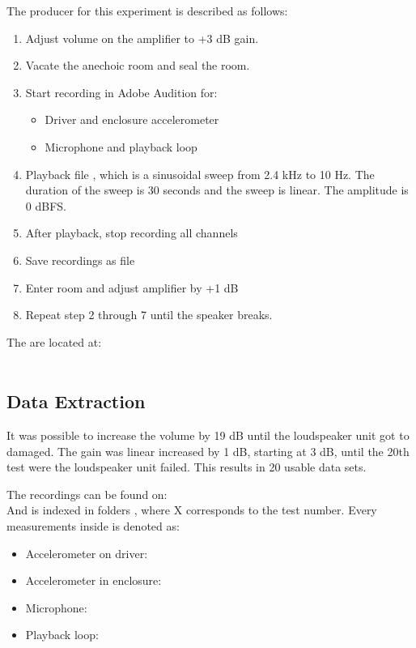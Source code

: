 The producer for this experiment is described as follows:
\vspace{-5mm}
\begin{enumerate}
\item Adjust volume on the amplifier to +3 dB gain.
\item Vacate the anechoic room and seal the room.
\item Start recording in Adobe Audition for:
\begin{itemize}
\item Driver and enclosure accelerometer
\item Microphone and playback loop
\end{itemize}
\item Playback file , which is a sinusoidal sweep from 2.4 kHz to 10 Hz. The duration of the sweep is 30 seconds and the sweep is linear. The amplitude is 0 dBFS.
\item After playback, stop recording all channels
\item Save recordings as  file
\item Enter room and adjust amplifier by +1 dB
\item Repeat step 2 through 7 until the speaker breaks.
\end{enumerate}

The  are located at:\\
\\




\subsection{Data Extraction}


It was possible to increase the volume by 19 dB until the loudspeaker unit got to damaged. The gain was linear increased by 1 dB, starting at 3 dB, until the 20th test were the loudspeaker unit failed. This results in 20 usable data sets.

The recordings can be found on:\\
And is indexed in folders , where X corresponds to the test number. Every measurements inside is denoted as:
\begin{itemize}
\item Accelerometer on driver: 
\item Accelerometer in enclosure: 
\item Microphone: 
\item Playback loop: 
\end{itemize}

